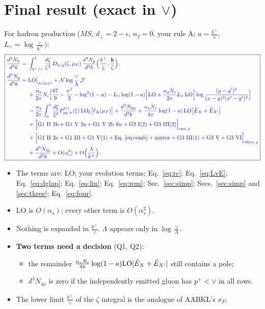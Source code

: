 \documentclass[10pt]{article}
\numberwithin{equation}{section}
\newcommand{\new}[1]{{\color{blue}#1}}
\newcommand{\Lv}{L_{\vee}}
\newcommand{\JJ}{\mathcal J}
\newcommand{\NN}{\mathcal N}
\newcommand{\Eh}{\hat E}
\newcommand{\LOx}[1]{{\rm LO}_\xi\big[#1\big]}
\begin{document}
\section{Final result (exact in \texorpdfstring{$\vee$}{vee})}\label{sec:final}
For hadron production ($\overline{MS}$, $d_\perp=2-\epsilon$, $n_f=0$, your rule A; $a=\frac{k^+}{\vee}$, $\Lv=\log\frac{\vee}{k^+}$):
\begin{equation}
\boxed{\new{\begin{aligned}
\frac{d^3N_h}{d^3k}={}&\int_{k^+/\vee}^1\frac{d\zeta}{\zeta^3}\,D_{h/g}(\zeta,\mu_F)\,\frac{d^3N_g}{d^3k}\Big(\frac{k^+}{\zeta},\frac{\mathbf k}{\zeta}\Big),\\
\frac{d^3N_g}{d^3k}={}&{\rm LO}\big|_{\alpha_s(\mu_F)}+\NN\log\frac{\vee}{\Lambda}\,\JJ\\
&+\frac{\alpha_s}{2\pi}N_c\Big[\frac{67}{9}-\frac{\pi^2}{3}-\log^2(1-a)-\Lv\log(1-a)\Big]{\rm LO}
+\frac{\alpha_sN_c}{2\pi}\Lv\,{\rm LO}\Big[\log\frac{(y-y')^4}{(x-y)^2(x'-y')^2}\Big]\\
&-\frac{\alpha_s}{2\pi}\int_{a}^1\frac{d\xi}{\xi^2}P^{(r)}_{gg,+}(\xi)\,\LOx{\ell_\Delta(\mu_F)}+\frac{d^3N_{\rm lin}}{d^3k}
+\frac{\alpha_sN_c}{4\pi}\log(1-a)\,{\rm LO}\big[\Eh_X+\Eh_{X'}\big]\\
&+\Big[\text{G1 II 2b}+\text{G1 V 2a}+\text{G1 V 2b fin}+\text{G2 I(2)}+\text{G3 III(2)}\Big]_{\text{two }\rho}\\
&+\Big[\text{G1 II 2a}+\text{G1 III}+\text{G1 V(1)}+\text{Eq.~\eqref{eq:comb}}+\text{mirror}+\text{G3 III(1)}+\text{G3 V}+\text{G3 VI}\Big]_{\text{three }\rho}\\
&+\frac{d^3N_{4\rho}}{d^3k}+O(\alpha_s^3)+O\Big(\frac{\Lambda}{k^+}\Big).
\end{aligned}}}
\label{eq:final}
\end{equation}
\begin{itemize}
\item The terms are: LO; your evolution terms; Eq.~\eqref{eq:rc}; Eq.~\eqref{eq:LvE}; Eq.~\eqref{eq:dglap}; Eq.~\eqref{eq:lin}; Eq.~\eqref{eq:rem}; Sec.~\ref{sec:simp}; Secs.~\ref{sec:simp} and \ref{sec:three}; Eq.~\eqref{eq:four}.
\item LO is $O(\alpha_s)$; every other term is $O(\alpha_s^2)$.
\item Nothing is expanded in $\frac{k^+}{\vee}$. $\Lambda$ appears only in $\log\frac{\vee}{\Lambda}$.
\item \textbf{Two terms need a decision} (Q1, Q2):
\begin{itemize}
\item the remainder $\frac{\alpha_sN_c}{4\pi}\log(1-a){\rm LO}[\Eh_X+\Eh_{X'}]$ still contains a pole;
\item $d^3N_{4\rho}$ is zero if the independently emitted gluon has $p^+<\vee$ in all rows.
\end{itemize}
\item The lower limit $\frac{k^+}{\vee}$ of the $\zeta$ integral is the analogue of AABKL's $x_F$.
\end{itemize}
\end{document}
